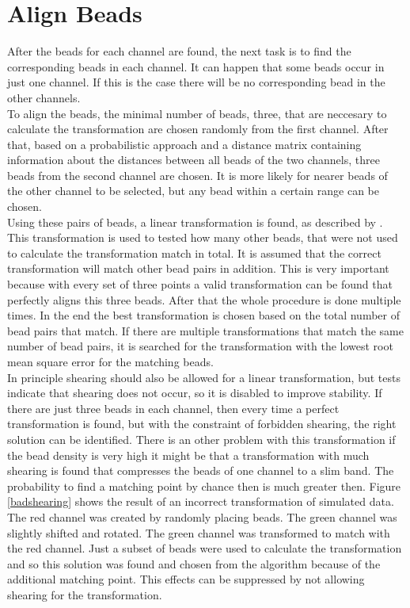 \section{Align Beads}
After the beads for each channel are found, the next task is to find the corresponding
beads in each channel. It can happen that some beads occur in just one channel.
If this is the case there will be no corresponding bead in the other
channels.\\
To align the beads, the minimal number of beads, three, that are neccesary to
calculate the transformation are chosen randomly from the first channel. After that, based on
a probabilistic approach and a distance matrix containing information about the
distances between all beads of the two channels, three beads from the
second channel are chosen. It is more likely for nearer beads of the other channel to be selected, but any bead within a certain range can be chosen.\\
Using these pairs of beads, a linear transformation is found, as described by
\cite{MAJoachim}.\newline
This transformation is used to tested how many other beads, that were not used to calculate the transformation match in
total. It is assumed that the correct transformation will match other bead pairs in addition.
This is very important because with every set of three points a valid transformation can be found that perfectly aligns this three beads. After that the whole
procedure is done multiple times. In the end the best transformation is
chosen based on the total number of bead pairs that match. If there are multiple transformations that match the same number of bead pairs, it is searched for the transformation with the lowest root mean square error for the matching beads.\\
In principle shearing should also be allowed for a linear transformation, but tests
indicate that shearing does not occur, so it is disabled to improve stability. If there are just
three beads in each channel, then every time a perfect transformation is found,
but with the constraint of forbidden shearing, the right solution can be
identified. There is an other problem with this transformation if the bead density is very high it might be that a transformation with much shearing is found that compresses the beads of one channel to a slim band. The probability to find a matching point by chance then is much greater then. Figure \ref{badshearing} shows the result of an incorrect transformation of simulated data. The red channel was created by randomly placing beads. The green channel was slightly shifted and rotated. The green channel was transformed to match with the red channel. Just a subset of beads were used to calculate the transformation and so this solution was found and chosen from the algorithm because of the additional matching point.\newline
This effects can be suppressed by not allowing shearing for the transformation.

